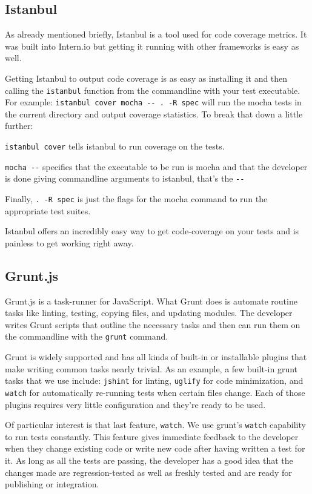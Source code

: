 \documentclass[12pt]{ucthesis}
\begin{document}
\subsection{Istanbul}
As already mentioned briefly, Istanbul\cite{Istanbul} is a tool used for code coverage metrics. It was built into Intern.io but getting it running with other frameworks is easy as well.

Getting Istanbul to output code coverage is as easy as installing it and then calling the \lstinline{istanbul} function from the commandline with your test executable.
For example: \lstinline{istanbul cover mocha -- . -R spec} will run the mocha tests in the current directory and output coverage statistics. To break that down a little further:

\lstinline{istanbul cover} tells istanbul to run coverage on the tests.

\lstinline{mocha --} specifies that the executable to be run is mocha and that the developer is done giving commandline arguments to istanbul, that's the \lstinline{--}

Finally, \lstinline{. -R spec} is just the flags for the mocha command to run the appropriate test suites.

Istanbul offers an incredibly easy way to get code-coverage on your tests and is painless to get working right away.

\subsection{Grunt.js}
Grunt.js\cite{GruntJS} is a task-runner for JavaScript. What Grunt does is automate routine tasks like linting, testing, copying files, and updating modules. The developer writes Grunt scripts that outline the necessary tasks and then can run them on the commandline with the \lstinline{grunt} command.

Grunt is widely supported and has all kinds of built-in or installable plugins that make writing common tasks nearly trivial. As an example, a few built-in grunt tasks that we use include: \lstinline{jshint} for linting, \lstinline{uglify} for code minimization, and \lstinline{watch} for automatically re-running tests when certain files change. Each of those plugins requires very little configuration and they're ready to be used.

Of particular interest is that last feature, \lstinline{watch}. We use grunt's \lstinline{watch} capability to run tests constantly. This feature gives immediate feedback to the developer when they change existing code or write new code after having written a test for it. As long as all the tests are passing, the developer has a good idea that the changes made are regression-tested as well as freshly tested and are ready for publishing or integration.
\end{document}
